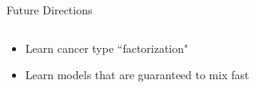 \documentclass[mathserif]{beamer}
\begin{document}
\begin{frame}{Future Directions}
\begin{columns}
\begin{column}{0.6\textwidth}
\begin{itemize}
  \item<1-> Learn cancer type ``factorization"
  \vspace{3em}
  \item<4> Learn models that are guaranteed to mix fast
\end{itemize}
\end{column}
\begin{column}{0.4\textwidth}
\end{column}
\end{columns}
\end{frame}
\end{document}
